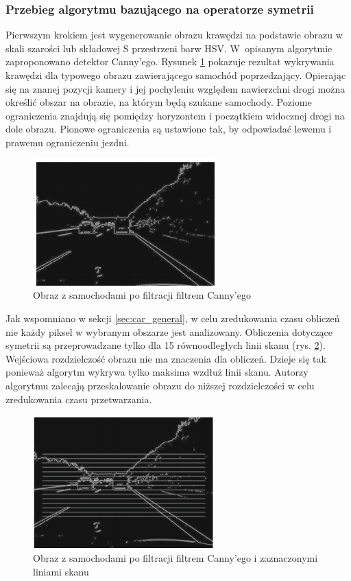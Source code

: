 \subsubsection{Przebieg algorytmu bazującego na operatorze symetrii}
Pierwszym krokiem jest wygenerowanie obrazu krawędzi na podstawie obrazu w skali szarości lub składowej S przestrzeni barw HSV. 
W~opisanym algorytmie zaproponowano detektor Canny'ego. 
Rysunek \ref{fig:car_edge} pokazuje rezultat wykrywania krawędzi dla typowego obrazu zawierającego samochód poprzedzający. 
Opierając się na znanej pozycji kamery i jej pochyleniu względem nawierzchni drogi można określić obszar na obrazie, na którym będą szukane samochody. 
Poziome ograniczenia znajdują się pomiędzy horyzontem i początkiem widocznej drogi na dole obrazu. 
Pionowe ograniczenia są ustawione tak, by odpowiadać lewemu i prawemu ograniczeniu jezdni. 

\begin{figure}
  \centering
  \includegraphics[width=7cm]{img/car_canny.png}
  \caption{Obraz z samochodami po filtracji filtrem Canny'ego\cite{T1}}
  \label{fig:car_edge}
\end{figure}

Jak wspomniano w sekcji \ref{sec:car_general}, w celu zredukowania czasu obliczeń nie każdy piksel w wybranym obszarze jest analizowany. 
Obliczenia dotyczące symetrii są przeprowadzane tylko dla 15 równoodległych linii skanu (rys. \ref{fig:car_scan_lines1}). 
Wejściowa rozdzielczość obrazu nie ma znaczenia dla obliczeń. %
Dzieje się tak ponieważ algorytm wykrywa tylko maksima wzdłuż linii skanu. Autorzy algorytmu zalecają przeskalowanie obrazu do niższej rozdzielczości w celu zredukowania czasu przetwarzania.

\begin{figure}
  \centering
  \includegraphics[width=7cm]{img/car_lines.png}
  \caption{Obraz z samochodami po filtracji filtrem Canny'ego i zaznaczonymi liniami skanu\cite{T1}}
  \label{fig:car_scan_lines1}
\end{figure}

